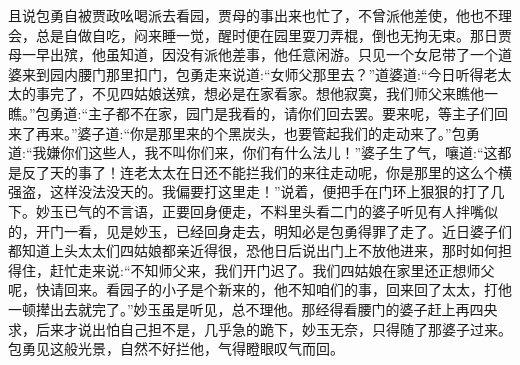 \begin{parag}
    且说包勇自被贾政吆喝派去看园，贾母的事出来也忙了，不曾派他差使，他也不理会，总是自做自吃，闷来睡一觉，醒时便在园里耍刀弄棍，倒也无拘无束。那日贾母一早出殡，他虽知道，因没有派他差事，他任意闲游。只见一个女尼带了一个道婆来到园内腰门那里扣门，包勇走来说道:“女师父那里去？”道婆道:“今日听得老太太的事完了，不见四姑娘送殡，想必是在家看家。想他寂寞，我们师父来瞧他一瞧。”包勇道:“主子都不在家，园门是我看的，请你们回去罢。要来呢，等主子们回来了再来。”婆子道:“你是那里来的个黑炭头，也要管起我们的走动来了。”包勇道:“我嫌你们这些人，我不叫你们来，你们有什么法儿！”婆子生了气，嚷道:“这都是反了天的事了！连老太太在日还不能拦我们的来往走动呢，你是那里的这么个横强盗，这样没法没天的。我偏要打这里走！”说着，便把手在门环上狠狠的打了几下。妙玉已气的不言语，正要回身便走，不料里头看二门的婆子听见有人拌嘴似的，开门一看，见是妙玉，已经回身走去，明知必是包勇得罪了走了。近日婆子们都知道上头太太们四姑娘都亲近得很，恐他日后说出门上不放他进来，那时如何担得住，赶忙走来说:“不知师父来，我们开门迟了。我们四姑娘在家里还正想师父呢，快请回来。看园子的小子是个新来的，他不知咱们的事，回来回了太太，打他一顿撵出去就完了。”妙玉虽是听见，总不理他。那经得看腰门的婆子赶上再四央求，后来才说出怕自己担不是，几乎急的跪下，妙玉无奈，只得随了那婆子过来。包勇见这般光景，自然不好拦他，气得瞪眼叹气而回。
\end{parag}


